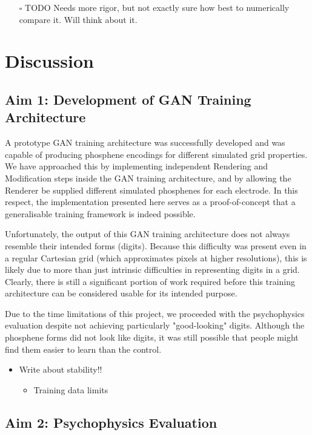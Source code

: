 \documentclass[a4paper,11pt,openany]{book}
\begin{document}
\begin{itemize}
\item[{$\square$}] TODO Needs more rigor, but not exactly sure how best to numerically compare it. Will think about it.
\end{itemize}

\part{Discussion}
\label{sec:orgd59c1cb}
\chapter{Aim 1: Development of GAN Training Architecture}
\label{sec:org562c76a}

A prototype GAN training architecture was successfully developed and was capable of producing phosphene encodings for different simulated grid properties.
We have approached this by implementing independent Rendering and Modification steps inside the GAN training architecture, and by allowing the Renderer be supplied different simulated phosphenes for each electrode.
In this respect, the implementation presented here serves as a proof-of-concept that a generalisable training framework is indeed possible.

Unfortunately, the output of this GAN training architecture does not always resemble their intended forms (digits).
Because this difficulty was present even in a regular Cartesian grid (which approximates pixels at higher resolutions), this is likely due to more than just intrinsic difficulties in representing digits in a grid.
Clearly, there is still a significant portion of work required before this training architecture can be considered usable for its intended purpose.

Due to the time limitations of this project, we proceeded with the psychophysics evaluation despite not achieving particularly "good-looking" digits.
Although the phosphene forms did not look like digits, it was still possible that people might find them easier to learn than the control.

\begin{itemize}
\item Write about stability!!
\begin{itemize}
\item Training data limits
\end{itemize}
\end{itemize}

\chapter{Aim 2: Psychophysics Evaluation}
\label{sec:orgabbc41e}
\end{document}
